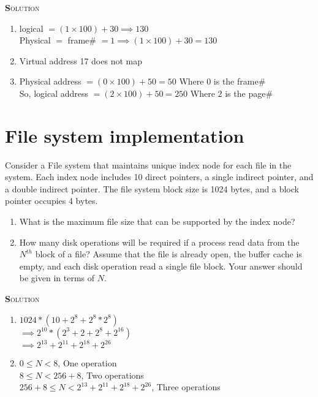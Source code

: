 \documentclass{article}
\newcommand{\smallcaps}[1]{\textsc{\textbf #1}\\}
\begin{document}
\begin{multicols}{2}
  \smallcaps{Solution}

  \begin{enumerate}
    \item logical $= (1 \times 100) + 30 \implies 130$ \\
      Physical $=$ frame\# $= 1 \implies (1 \times 100) + 30 = 130$
    \item Virtual address 17 does not map
    \item Physical address $= (0 \times 100) + 50 = 50$ Where $0$ is the frame\# \\
      So, logical address $= (2 \times 100) + 50 = 250$ Where $2$ is the page\#
  \end{enumerate}

  \section*{File system implementation}
  Consider a File system that maintains unique index node for each
  file in the system. Each index node includes 10 direct pointers, a single indirect pointer,
  and a double indirect pointer. The file system block size is 1024 bytes, and a block pointer
  occupies 4 bytes.

  \begin{enumerate}
    \item What is the maximum file size that can be supported by the index node?
    \item How many disk operations will be required if a process read data from the $N^{th}$ block
      of a file? Assume that the file is already open, the buffer cache is empty, and each disk
      operation read a single file block. Your answer should be given in terms of $N$.
  \end{enumerate}

  \smallcaps{Solution}

  \begin{enumerate}
    \item $1024 * (10 + 2^8 + 2^8 * 2^8)$ \\
      $\implies 2^{10} * (2^3 + 2 + 2^8 + 2^{16})$ \\
      $\implies 2^{13} + 2^{11} + 2^{18} + 2^{26}$ \\
    \item $0 \le N < 8$, One operation \\
      $8 \le N < 256 + 8$, Two operations \\
      $256 + 8 \le N < 2^{13} + 2^{11} + 2^{18} + 2^{26}$, Three operations
  \end{enumerate}

\end{multicols} 
\end{document}
